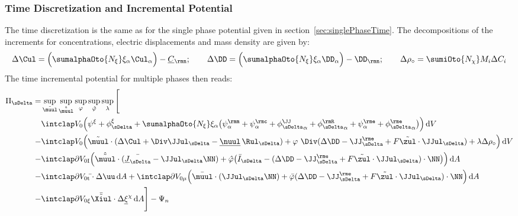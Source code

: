 \subsubsection{Time Discretization and Incremental Potential} %
The time discretization is the same as for the single phase potential given in section~\ref{sec:singlePhaseTime}. The decompositions of the increments for concentrations, electric displacements and mass density are given by:
\begin{align}
  \Delta\Cul = \Big(\sumalphaOto{\Nxi}\xia\Cula\Big) - \Culn; \qquad \Delta\DD = \Big(\sumalphaOto{\Nxi}\xia\DDa\Big) - \DD_\rmn; \qquad \Delta\rho_\circ = \sumiOto{\Nchi} M_i \Delta C_i
\end{align} 
The time incremental potential for multiple phases then reads:
\begin{align}
  \begin{aligned}
    \PiDelta = & \sup_{\muultilde} \sup_{\hat\muultilde} \sup_{\varphi} \sup_{\hat\varphi} \sup_{\lambda}\Bigg[ \quad \\
            &\intVO \Big(\psixi+\phixiDelta + \sumalphaOto{\Nxi} \xia\big(\psima + \psica + \phiJJDeltaa + \phiRDeltaa + \psiea + \phieDeltaa \big) \Big)\dV \\
            -&\intVO \Big(\muultilde\cdot(\Delta\Cul+\Div\JJulDelta-\nuull\,\RulDelta) + \varphi\ \Div(\Delta\DD - \JJeDelta + F\zultilde\cdot\JJulDelta) + \lambda \Delta\rho_\circ \Big) \dV \\
            -&\intdVOx{I} \Big(\hat\muultilde \cdot (\bar\JulDelta - \JJulDelta\NN) + \hat\varphi \big(\bar I_{\sDelta}  - (\Delta\DD-\JJeDelta+F\zultilde\cdot\JJulDelta)\cdot\NN\big) \Big) \dA \\
            -& \intdVOx{t} \bar\tt \cdot \Delta\uu \dA + \intdVOx{\mu} \Big(\bar\muul\cdot(\JJulDelta\NN) + \bar\varphi(\Delta\DD-\JJeDelta+F\tilde\zul\cdot\JJulDelta)\cdot\NN \Big) \dA \\ 
            -&\intdVOx{\xi} \bar\Xiultilde\cdot\Delta\xichiul\dA  
            \Bigg] - \Psi_n
  \end{aligned}                                      
\end{align}

